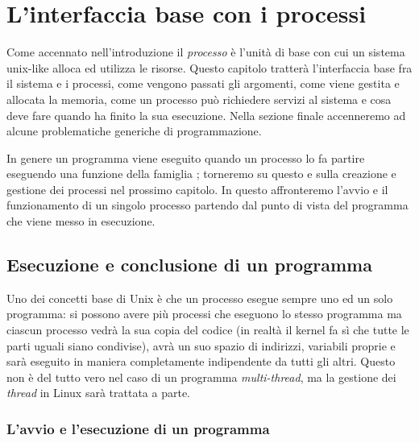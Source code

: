 
\chapter{L'interfaccia base con i processi}
\label{cha:process_interface}

Come accennato nell'introduzione il \textsl{processo} è l'unità di base con
cui un sistema unix-like alloca ed utilizza le risorse.  Questo capitolo
tratterà l'interfaccia base fra il sistema e i processi, come vengono passati
gli argomenti, come viene gestita e allocata la memoria, come un processo può
richiedere servizi al sistema e cosa deve fare quando ha finito la sua
esecuzione. Nella sezione finale accenneremo ad alcune problematiche generiche
di programmazione.

In genere un programma viene eseguito quando un processo lo fa partire
eseguendo una funzione della famiglia ; torneremo su questo e sulla
creazione e gestione dei processi nel prossimo capitolo. In questo
affronteremo l'avvio e il funzionamento di un singolo processo partendo dal
punto di vista del programma che viene messo in esecuzione.


\section{Esecuzione e conclusione di un programma}

Uno dei concetti base di Unix è che un processo esegue sempre uno ed un solo
programma: si possono avere più processi che eseguono lo stesso programma ma
ciascun processo vedrà la sua copia del codice (in realtà il kernel fa sì che
tutte le parti uguali siano condivise), avrà un suo spazio di indirizzi,
variabili proprie e sarà eseguito in maniera completamente indipendente da
tutti gli altri. Questo non è del tutto vero nel caso di un programma
\textit{multi-thread}, ma la gestione dei \textit{thread} in Linux sarà
trattata a parte.


\subsection{L'avvio e l'esecuzione di un programma}
\label{sec:proc_main}

